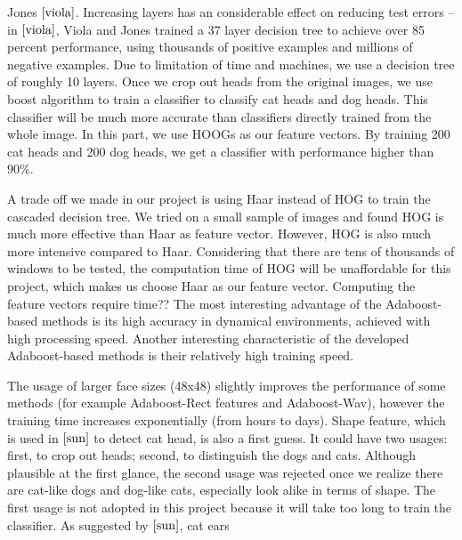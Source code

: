 \documentclass[12pt]{article}
\begin{document}
Jones $\cite{viola}$. Increasing layers has an considerable effect on reducing test errors -- in $\cite{viola}$, Viola and Jones trained a 37 layer decision tree to achieve over 85 percent performance, using thousands of positive examples and millions of negative examples. Due to limitation of time and machines, we use a decision tree of roughly 10 layers. Once we crop out heads from the original images, we use boost algorithm to train a classifier to classify cat heads and dog heads. This classifier will be much more accurate than classifiers directly trained from the whole image. In this part, we use HOOGs as our feature vectors. By training 200 cat heads and 200 dog heads, we get a classifier with performance higher than $90\%$.  

A trade off we made in our project is using Haar instead of HOG to train the cascaded decision tree. We tried on a small sample of images and found HOG is much more effective than Haar as feature vector. However, HOG is also much more intensive compared to Haar. Considering that there are tens of thousands of windows to be tested, the computation time of HOG will be unaffordable for this project, which makes us choose Haar as our feature vector. Computing the feature vectors require time??
The most interesting advantage of the Adaboost-based methods is its high accuracy
in dynamical environments, achieved with high processing speed.  Another interesting characteristic of the developed Adaboost-based methods is their relatively high training speed.


The usage of larger face sizes (48x48) slightly improves the performance of some methods (for example Adaboost-Rect features and Adaboost-Wav), however the training time increases exponentially (from hours to days).
Shape feature, which is used in $\cite{sun}$ to detect cat head, is also a first guess. It could have two usages: first, to crop out heads; second, to distinguish the dogs and cats. Although plausible at the first glance, the second usage was rejected once we realize there are cat-like dogs and dog-like cats, especially look alike in terms of shape. The first usage is not adopted in this project because it will take too long to train the classifier. As suggested by $\cite{sun}$,  cat ears
\end{document}
